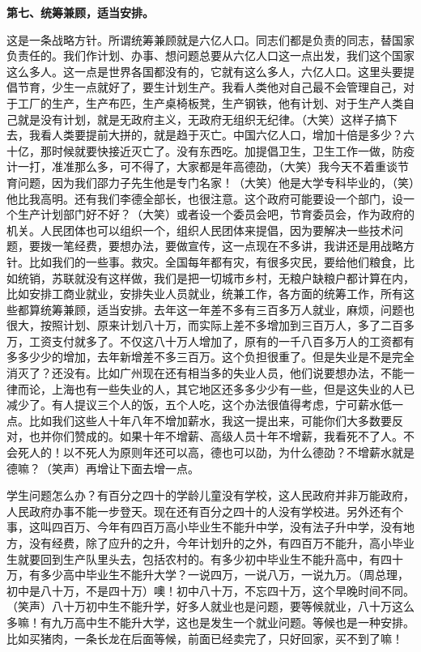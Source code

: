 \textbf{第七、统筹兼顾，适当安排。}

这是一条战略方针。所谓统筹兼顾就是六亿人口。同志们都是负责的同志，替国家负责任的。我们作计划、办事、想问题总要从六亿人口这一点出发，我们这个国家这么多人。这一点是世界各国都没有的，它就有这么多人，六亿人口。这里头要提倡节育，少生一点就好了，要生计划生产。我看人类他对自己最不会管理自己，对于工厂的生产，生产布匹，生产桌椅板凳，生产钢铁，他有计划、对于生产人类自己就是没有计划，就是无政府主义，无政府无组织无纪律。（大笑）这样子搞下去，我看人类要提前大拼的，就是趋于灭亡。中国六亿人口，增加十倍是多少？六十亿，那时候就要快接近灭亡了。没有东西吃。加提倡卫生，卫生工作一做，防疫计一打，准准那么多，可不得了，大家都是年高德劭，（大笑）我今天不着重谈节育问题，因为我们邵力子先生他是专门名家！（大笑）他是大学专科毕业的，（笑）他比我高明。还有我们李德全部长，也很注意。这个政府可能要设一个部门，设一个生产计划部门好不好？（大笑）或者设一个委员会吧，节育委员会，作为政府的机关。人民团体也可以组织一个，组织人民团体来提倡，因为要解决一些技术问题，要拨一笔经费，要想办法，要做宣传，这一点现在不多讲，我讲还是用战略方针。比如我们的一些事。救灾。全国每年都有灾，有很多灾民，要给他们粮食，比如统销，苏联就没有这样做，我们是把一切城市乡村，无粮户缺粮户都计算在内，比如安排工商业就业，安排失业人员就业，统兼工作，各方面的统筹工作，所有这些都算统筹兼顾，适当安排。去年这一年差不多有三百多万人就业，麻烦，问题也很大，按照计划、原来计划八十万，而实际上差不多增加到三百万人，多了二百多万，工资支付就多了。不仅这八十万人增加了，原有的一千八百多万人的工资都有多多少少的增加，去年新增差不多三百万。这个负担很重了。但是失业是不是完全消灭了？还没有。比如广州现在还有相当多的失业人员，他们说要想办法，不能一律而论，上海也有一些失业的人，其它地区还多多少少有一些，但是这失业的人已减少了。有人提议三个人的饭，五个人吃，这个办法很值得考虑，宁可薪水低一点。比如我们这些人十年八年不增加薪水，我这一提出来，可能你们大多数要反对，也并你们赞成的。如果十年不增薪、高级人员十年不增薪，我看死不了人。不会死人的！以不死人为原则年还可以高，德也可以劭，为什么德劭？不增薪水就是德嘛？（笑声）再增让下面去增一点。

学生问题怎么办？有百分之四十的学龄儿童没有学校，这人民政府并非万能政府，人民政府办事不能一步登天。现在还有百分之四十的人没有学校进。另外还有个事，这叫四百万、今年有四百万高小毕业生不能升中学，没有法子升中学，没有地方，没有经费，除了应升的之升，今年计划升的之外，有四百万不能升，高小毕业生就要回到生产队里头去，包括农村的。有多少初中毕业生不能升高中，有四十万，有多少高中毕业生不能升大学？一说四万，一说八万，一说九万。（周总理，初中是八十万，不是四十万）噢！初中八十万，不忘四十万，这个早晚时间不同。（笑声）八十万初中生不能升学，好多人就业也是问题，要等候就业，八十万这么多嘛！有九万高中生不能升大学，这也是发生一个就业问题。等候也是一种安排。比如买猪肉，一条长龙在后面等候，前面已经卖完了，只好回家，买不到了嘛！

